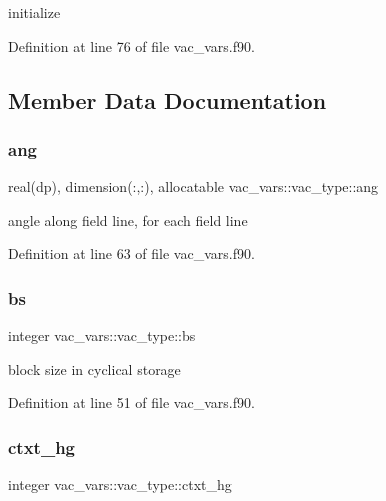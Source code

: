 initialize 



Definition at line 76 of file vac\+\_\+vars.\+f90.



\subsection{Member Data Documentation}
\mbox{\label{structvac__vars_1_1vac__type_a8a79c1f2b383fda22b5f3cca1f7afd31}} 
\subsubsection{\texorpdfstring{ang}{ang}}
{\footnotesize\ttfamily real(dp), dimension(\+:,\+:), allocatable vac\+\_\+vars\+::vac\+\_\+type\+::ang}



angle along field line, for each field line 



Definition at line 63 of file vac\+\_\+vars.\+f90.

\mbox{\label{structvac__vars_1_1vac__type_aacac3cfc228c0a5de03540bf63bc9014}} 
\subsubsection{\texorpdfstring{bs}{bs}}
{\footnotesize\ttfamily integer vac\+\_\+vars\+::vac\+\_\+type\+::bs}



block size in cyclical storage 



Definition at line 51 of file vac\+\_\+vars.\+f90.

\mbox{\label{structvac__vars_1_1vac__type_a975901d1517e02c7a78be46054decde0}} 
\subsubsection{\texorpdfstring{ctxt\+\_\+hg}{ctxt\_hg}}
{\footnotesize\ttfamily integer vac\+\_\+vars\+::vac\+\_\+type\+::ctxt\+\_\+hg}



